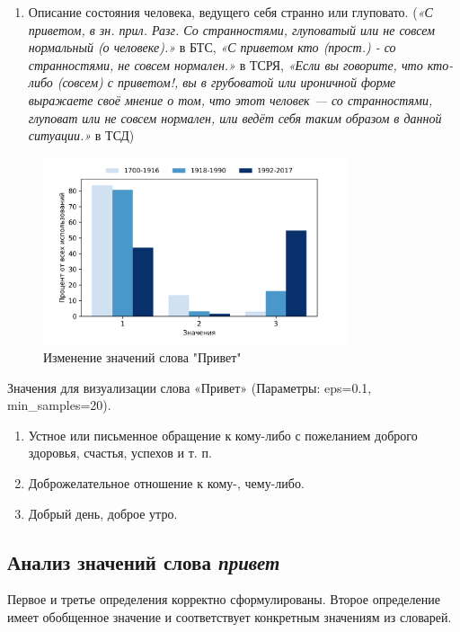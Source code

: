 \begin{enumerate}
    \item Описание состояния человека, ведущего себя странно или глуповато.
(\textit{«С приветом, в зн. прил. Разг. Со странностями, глуповатый или не совсем нормальный (о человеке).»} в БТС,
\textit{«С приветом кто (прост.) - со странностями, не совсем нормален.»} в ТСРЯ,
\textit{«Если вы говорите, что кто-либо (совсем) с приветом!, вы в грубоватой или ироничной форме
выражаете своё мнение о том, что этот человек — со странностями, глуповат или не совсем нормален,
или ведёт себя таким образом в данной ситуации.»} в ТСД)
\end{enumerate}

\begin{figure}[H]
	\centering
	\includegraphics[width=0.8\textwidth]{img/visualizations/privet_minimal}
	\caption{Изменение значений слова "Привет"}
	\label{fig:Привет}
\end{figure}

Значения для визуализации слова «Привет» (Параметры: eps=0.1, min\_samples=20).

\begin{enumerate}
    \item Устное или письменное обращение к кому-либо с пожеланием доброго здоровья, счастья, успехов и т. п.
    \item Доброжелательное отношение к кому-, чему-либо.
    \item Добрый день, доброе утро.
\end{enumerate}

\subsection*{Анализ значений слова \textit{привет}}

Первое и третье определения корректно сформулированы.
Второе определение имеет обобщенное значение и соответствует конкретным значениям из словарей.

